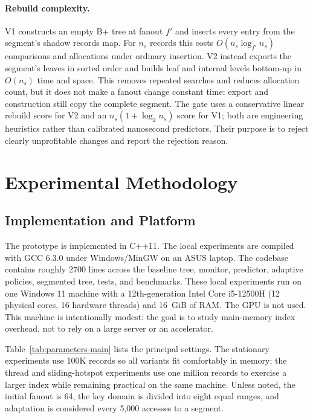 \documentclass[sigconf,review,anonymous]{acmart}
\begin{document}
\paragraph{Rebuild complexity.}
V1 constructs an empty B+ tree at fanout \(f'\) and inserts every entry from
the segment's shadow records map.  For \(n_s\) records this costs
\(O(n_s\log_{f'}n_s)\) comparisons and allocations under ordinary insertion.
V2 instead exports the segment's leaves in sorted order and builds leaf and
internal levels bottom-up in \(O(n_s)\) time and space.  This removes repeated
searches and reduces allocation count, but it does not make a fanout change
constant time: export and construction still copy the complete segment.  The
gate uses a conservative linear rebuild score for V2 and an
\(n_s(1+\log_2 n_s)\) score for V1; both are engineering heuristics rather than
calibrated nanosecond predictors.  Their purpose is to reject clearly
unprofitable changes and report the rejection reason.

\section{Experimental Methodology}
\label{sec:methodology}

\subsection{Implementation and Platform}

The prototype is implemented in C++11.  The local experiments are compiled
with GCC 6.3.0 under Windows/MinGW on an ASUS laptop.  The codebase contains
roughly 2700 lines across the baseline
tree, monitor, predictor, adaptive policies, segmented tree, tests, and
benchmarks.  These local experiments run on one Windows 11 machine with a 12th-generation
Intel Core i5-12500H (12 physical cores, 16 hardware threads) and 16~GiB of
RAM.  The GPU is not used.  This machine is intentionally modest: the goal is
to study main-memory index overhead, not to rely on a large server or an
accelerator.

Table~\ref{tab:parameters-main} lists the principal settings.  The stationary
experiments use 100K records so all variants fit comfortably in memory; the
thread and sliding-hotspot experiments use one million records to exercise a
larger index while remaining practical on the same machine.  Unless noted,
the initial fanout is 64, the key domain is divided into eight equal ranges,
and adaptation is considered every 5,000 accesses to a segment.
\end{document}
